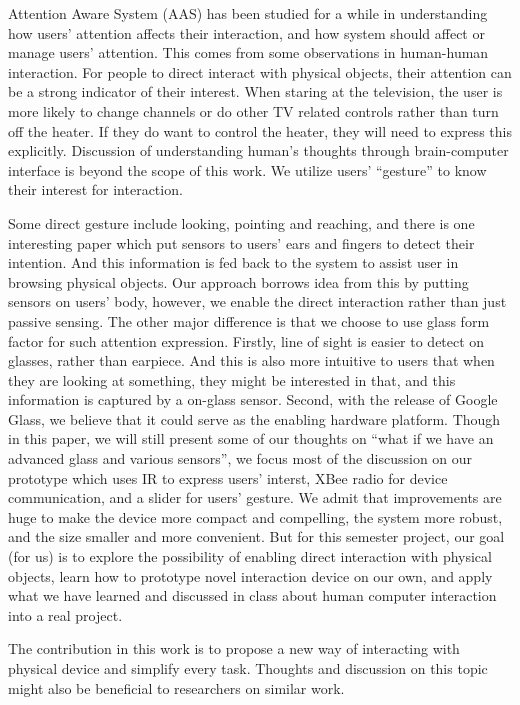 Attention Aware System (AAS) \cite{horvitz2003models} has been studied for a while in understanding how users' attention affects their interaction, and how system should affect or manage users' attention. This comes from some observations in human-human interaction. For people to direct interact with physical objects, their attention can be a strong indicator of their interest. When staring at the television, the user is more likely to change channels or do other TV related controls rather than turn off the heater. If they do want to control the heater, they will need to express this explicitly. Discussion of understanding human's thoughts through brain-computer interface is beyond the scope of this work. We utilize users' ``gesture'' to know their interest for interaction.

Some direct gesture include looking, pointing and reaching, and there is one interesting paper \cite{Merrill:2007:ALP:1758156.1758158} which put sensors to users' ears and fingers to detect their intention. And this information is fed back to the system to assist user in browsing physical objects. Our approach borrows idea from this by putting sensors on users' body, however, we enable the direct interaction rather than just passive sensing. The other major difference is that we choose to use glass form factor for such attention expression. Firstly, line of sight is easier to detect on glasses, rather than earpiece. And this is also more intuitive to users that when they are looking at something, they might be interested in that, and this information is captured by a on-glass sensor. Second, with the release of Google Glass, we believe that it could serve as the enabling hardware platform. Though in this paper, we will still present some of our thoughts on ``what if we have an advanced glass and various sensors'', we focus most of the discussion on our prototype which uses IR to express users' interst, XBee radio for device communication, and a slider for users' gesture. We admit that improvements are huge to make the device more compact and compelling, the system more robust, and the size smaller and more convenient. But for this semester project, our goal (for us) is to explore the possibility of enabling direct interaction with physical objects, learn how to prototype novel interaction device on our own, and apply what we have learned and discussed in class about human computer interaction into a real project.

The contribution in this work is to propose a new way of interacting with physical device and simplify every task. Thoughts and discussion on this topic might also be beneficial to researchers on similar work.

